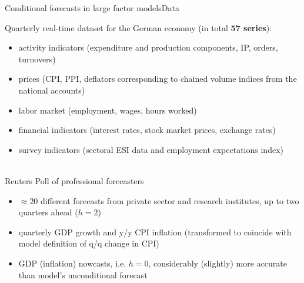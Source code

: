 \documentclass[xcolor=svgnames, 10pt, aspectratio=169]{beamer}
\begin{document}
\begin{frame}{Conditional forecasts in large factor models}{Data}

    Quarterly real-time dataset for the German economy (in total \textbf{57 series}):
    {\footnotesize
    \begin{itemize}
        \item activity indicators (expenditure and production components, IP, orders, turnovers)
        \item prices (CPI, PPI, deflators corresponding to chained volume indices from the national accounts)
        \item labor market (employment, wages, hours worked)
        \item financial indicators (interest rates, stock market prices, exchange rates)
        \item survey indicators (sectoral ESI data and employment expectations index)\\~\\
    \end{itemize}
    }

    Reuters Poll of professional forecasters
    {\footnotesize
    \begin{itemize}
      \item $\approx 20$ different forecasts from private sector and research institutes, up to two quarters ahead ($h=2$) 
      \item quarterly GDP growth and y/y CPI inflation (transformed to coincide with model definition of q/q change in CPI)
      \item GDP (inflation) nowcasts, i.e. $h=0$, considerably (slightly) more accurate than model's unconditional forecast
    \end{itemize}
    }
\end{frame}
\end{document}
